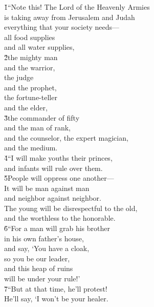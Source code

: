 \begin{poetry}
\poeml {}
\v{1}``Note this! The Lord  of the Heavenly Armies \\
\poemll    is taking away from Jerusalem and Judah \\
\poemlll       everything that your society needs--- \\
\poeml all food supplies \\
\poemll    and all water supplies, \\
\poeml \v{2}the mighty man \\
\poemll    and the warrior, \\
\poeml the judge \\
\poemll    and the prophet, \\
\poeml the fortune-teller \\
\poemll    and the elder, \\
\poeml \v{3}the commander of fifty \\
\poemll    and the man of rank, \\
\poeml and the counselor, the expert magician, \\
\poemll    and the medium. \\
\poeml \v{4}``I will make youths their princes, \\
\poemll    and infants will rule over them. \\
\poeml \v{5}People will oppress one another--- \\
\poemll    It will be man against man \\
\poemlll       and neighbor against neighbor. \\
\poeml The young will be disrespectful to the old, \\
\poemll    and the worthless to the honorable. \\
\poeml \v{6}``For a man will grab his brother \\
\poemll    in his own father's house, \\
\poeml and say, `You have a cloak, \\
\poemll    so you be our leader, \\
\poeml and this heap of ruins \\
\poemll    will be under your rule!' \\
\poeml \v{7}``But at that time, he'll protest! \\
\poemll    He'll say, `I won't be your healer. \\

\end{poetry}
